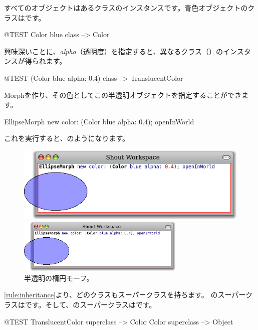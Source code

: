 \documentclass[a4paper,10pt,twoside]{book}
\begin{document}
\noindent
すべてのオブジェクトはあるクラスのインスタンスです。青色オブジェクトのクラスはです。
\begin{code}{@TEST}
Color blue class --> Color
\end{code}

\noindent
興味深いことに、\emph{alpha}（透明度）を指定すると、異なるクラス（）のインスタンスが得られます。
\begin{code}{@TEST}
(Color blue alpha: 0.4) class --> TranslucentColor
\end{code}

\noindent
Morphを作り、その色としてこの半透明オブジェクトを指定することができます。
\begin{code}{}
EllipseMorph new color: (Color blue alpha: 0.4); openInWorld
\end{code}
\noindent
これを実行すると、のようになります。

\begin{center}
\begin{figure}[!ht]
\ifluluelse
	{\centerline {\includegraphics[scale=0.7]{TranslucentEllipse}}}
	{\centerline {\includegraphics[width=8cm]{TranslucentEllipse}}}
\caption{半透明の楕円モーフ。}
\end{figure}
\end{center}

\ref{rule:inheritance}より、どのクラスもスーパークラスを持ちます。
のスーパークラスはです。そして、のスーパークラスはです。
\begin{code}{@TEST}
TranslucentColor superclass --> Color
Color superclass                   --> Object
\end{code}
\end{document}
